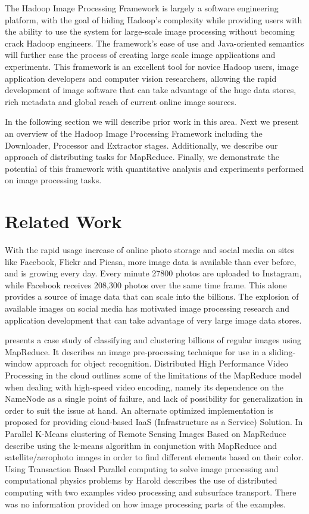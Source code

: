 \documentclass[conference]{IEEEtran}
\begin{document}
The Hadoop Image Processing Framework is largely a software
engineering platform, with the goal of hiding Hadoop's complexity
while providing users with the ability to use the system for
large-scale image processing without becoming crack Hadoop engineers.
The framework's ease of use and Java-oriented semantics will further
ease the process of creating large scale image applications and
experiments. This framework is an excellent tool for novice Hadoop
users, image application developers and computer vision researchers,
allowing the rapid development of image software that can take
advantage of the huge data stores, rich metadata and global reach of
current online image sources.
	
In the following section we will describe prior work in this
area. Next we present an overview of the Hadoop Image Processing
Framework including the Downloader, Processor and Extractor
stages. Additionally, we describe our approach of distributing tasks
for MapReduce. Finally, we demonstrate the potential of this framework
with quantitative analysis and experiments performed on image
processing tasks.
	
\section{Related Work}
With the rapid usage increase of online photo storage and social media
on sites like Facebook, Flickr and Picasa, more image data is
available than ever before, and is growing every day.  Every minute
27800 photos are uploaded to Instagram, while Facebook receives
208,300 photos over the same time frame.\cite{Horaczek2013} This alone
provides a source of image data that can scale into the billions.  The
explosion of available images on social media has motivated image
processing research and application development that can take
advantage of very large image data stores.
	
\cite{White2010} presents a case study of classifying and clustering billions of regular images using MapReduce. It describes an image pre-processing technique for use in a sliding-window approach for object recognition.  Distributed High Performance Video Processing in the cloud outlines some of the limitations of the MapReduce model when dealing with high-speed video encoding, namely its dependence on the NameNode as a single point of failure, and lack of possibility for generalization in order to suit the issue at hand. An alternate optimized implementation is proposed for providing cloud-based IaaS (Infrastructure as a Service) Solution. In Parallel K-Means clustering of Remote Sensing Images Based on MapReduce \cite{Lv2010} describe using the k-means algorithm in conjunction with MapReduce and satellite/aerophoto images in order to find different elements based on their color. Using Transaction Based Parallel computing to solve image processing and computational physics problems by Harold describes the use of distributed computing with two examples video processing and subsurface transport. There was no information provided on how image processing parts of the examples. 
	
\end{document}
